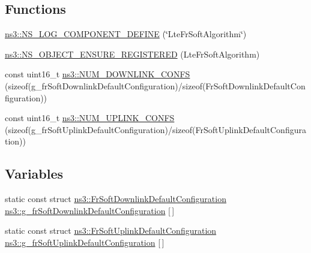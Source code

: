 \subsection*{Functions}
\begin{DoxyCompactItemize}
\item 
\hyperlink{namespacens3_ad4b76bf7d54b8d2fea1e5c10f4c70e2d}{ns3\+::\+N\+S\+\_\+\+L\+O\+G\+\_\+\+C\+O\+M\+P\+O\+N\+E\+N\+T\+\_\+\+D\+E\+F\+I\+NE} (\char`\"{}Lte\+Fr\+Soft\+Algorithm\char`\"{})
\item 
\hyperlink{namespacens3_aad5c3165e4639cf923f30652dbc8c577}{ns3\+::\+N\+S\+\_\+\+O\+B\+J\+E\+C\+T\+\_\+\+E\+N\+S\+U\+R\+E\+\_\+\+R\+E\+G\+I\+S\+T\+E\+R\+ED} (Lte\+Fr\+Soft\+Algorithm)
\item 
const uint16\+\_\+t \hyperlink{namespacens3_ab9bd5c01054da3f10f89d2856869821e}{ns3\+::\+N\+U\+M\+\_\+\+D\+O\+W\+N\+L\+I\+N\+K\+\_\+\+C\+O\+N\+FS} (sizeof(g\+\_\+fr\+Soft\+Downlink\+Default\+Configuration)/sizeof(Fr\+Soft\+Downlink\+Default\+Configuration))
\item 
const uint16\+\_\+t \hyperlink{namespacens3_a5447deb64788f34e98b769804a4c5fa8}{ns3\+::\+N\+U\+M\+\_\+\+U\+P\+L\+I\+N\+K\+\_\+\+C\+O\+N\+FS} (sizeof(g\+\_\+fr\+Soft\+Uplink\+Default\+Configuration)/sizeof(Fr\+Soft\+Uplink\+Default\+Configuration))
\end{DoxyCompactItemize}
\subsection*{Variables}
\begin{DoxyCompactItemize}
\item 
static const struct \hyperlink{structns3_1_1FrSoftDownlinkDefaultConfiguration}{ns3\+::\+Fr\+Soft\+Downlink\+Default\+Configuration} \hyperlink{namespacens3_a3398817fca0ffda821f24d8689d1b8dd}{ns3\+::g\+\_\+fr\+Soft\+Downlink\+Default\+Configuration} \mbox{[}$\,$\mbox{]}
\item 
static const struct \hyperlink{structns3_1_1FrSoftUplinkDefaultConfiguration}{ns3\+::\+Fr\+Soft\+Uplink\+Default\+Configuration} \hyperlink{namespacens3_a8a93656520f0f40948463057f88a266a}{ns3\+::g\+\_\+fr\+Soft\+Uplink\+Default\+Configuration} \mbox{[}$\,$\mbox{]}
\end{DoxyCompactItemize}
